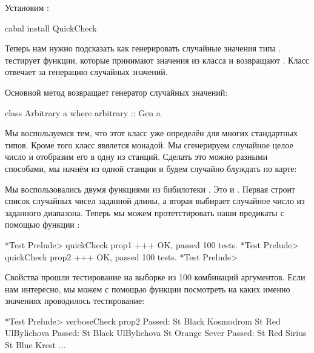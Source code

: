 Установим :


\begin{code}
cabal install QuickCheck
\end{code}

Теперь нам нужно подсказать  как
генерировать случайные значения типа .
 тестирует функции, которые принимают 
значения из класса  и возвращают .
Класс  отвечает за генерацию случайных значений.

Основной метод  возвращает генератор случайных значений:

\begin{code}
class Arbitrary a where
    arbitrary :: Gen a
\end{code}

Мы воспользуемся тем, что этот класс уже определён для
многих стандартных типов. Кроме того класс 
явялется монадой. Мы сгенерируем случайное целое число
и отобразим его в одну из станций. Сделать это можно разными
способами, мы начнём из одной станции и будем случайно 
блуждать по карте:


Мы воспользовались двумя функциями из бибилотеки .
Это  и . Первая строит список случайных
чисел заданной длины, а вторая выбирает случайное число из заданного
диапазона. Теперь мы можем протетстировать наши предикаты
с помощью функции :

\begin{code}
*Test Prelude> quickCheck prop1
+++ OK, passed 100 tests.
*Test Prelude> quickCheck prop2
+++ OK, passed 100 tests.
*Test Prelude> 
\end{code}

Свойства прошли тестирование на выборке из 100 
комбинаций аргументов.
Если нам интересно, мы можем с помощью функции
 посмотреть на каких именно
значениях проводилось тестирование:

\begin{code}
*Test Prelude> verboseCheck prop2
Passed:  
St Black Kosmodrom
St Red UlBylichova
Passed: 
St Black UlBylichova
St Orange Sever
Passed:  
St Red Sirius
St Blue Krest
...
\end{code}



